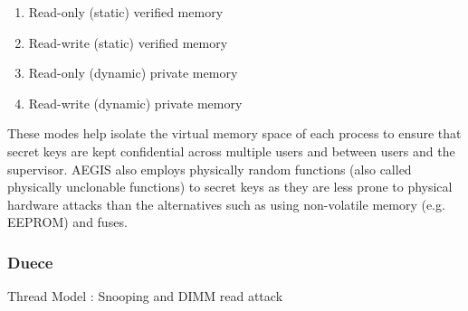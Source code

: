 \begin{enumerate}[noitemsep, topsep=0pt]
    \item Read-only (static) verified memory
    \item Read-write (static) verified memory
    \item Read-only (dynamic) private memory
    \item Read-write (dynamic) private memory
\end{enumerate}

These modes help isolate the virtual memory space of each process to ensure
that secret keys are kept confidential across multiple users and between users
and the supervisor. AEGIS also employs physically random functions (also called
physically unclonable functions) to secret keys as they are less prone to
physical hardware attacks than the alternatives such as using non-volatile
memory (e.g. EEPROM) and fuses.

\subsubsection{Duece}

Thread Model : Snooping and DIMM read attack

